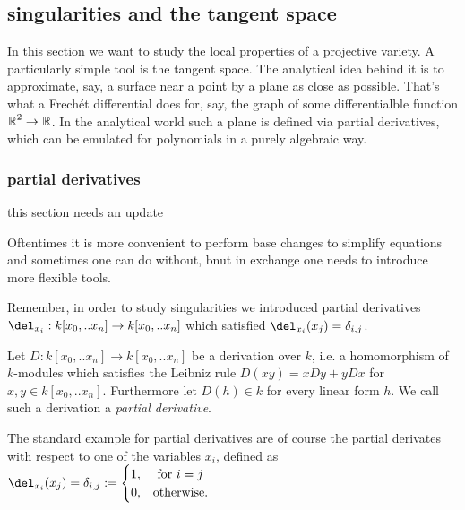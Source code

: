 \subsection{singularities and the tangent space}



In this section we want to study the local properties of a projective variety.
A particularly simple tool is the tangent space.
The analytical idea behind it is to approximate, say, a surface near a point by a plane as close as possible.
That's what a Frechét differential does for, say,  the graph of some differentialble function $\operatorname{\mathbb R}^2 \to \operatorname{\mathbb R}$.
In the analytical world such a plane is defined via partial derivatives, which can be emulated for polynomials in a purely algebraic way.

\subsubsection{partial derivatives}

\begin{todo}
\item this section needs an update
\end{todo}
Oftentimes it is more convenient to perform base changes to simplify equations and sometimes one can do without, bnut in exchange one needs to introduce more flexible tools.

Remember, in order to study singularities we introduced partial derivatives $\del_{x_i} : k[x_0,..x_n] \to k[x_0,..x_n]$ which satisfied $\del_{x_i}(x_j) = \delta_{i,j}$.

\begin{definition}
Let $D : k[x_0,..x_n] \to k[x_0,..x_n]$ be a derivation over $k$, i.e. a homomorphism of $k$-modules which satisfies the Leibniz rule $D(xy) = xDy+yDx$ for $x,y \in k[x_0,..x_n]$. Furthermore let $D(h) \in k$ for every linear form $h$. We call such a derivation a \emph{partial derivative}.
\end{definition}

\begin{example}
The standard example for partial derivatives are of course the partial derivates with respect to one of the variables $x_i$, defined as $\del_{x_i}(x_j) = \delta_{i,j} := \begin{cases} 1, & \text{ for } i = j \\ 0, & \text {otherwise.} \end{cases}$
\end{example}

